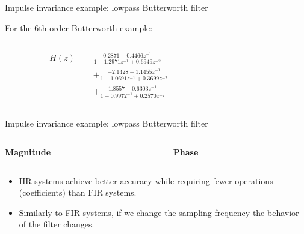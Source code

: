 \documentclass[10pt, aspectratio=169]{beamer}
\begin{document}
%
\begin{frame}{Impulse invariance example: lowpass Butterworth filter}

For the 6th-order Butterworth example:

\begin{columns}
	\begin{column}{0.5\textwidth}
		\begin{align*}
		H(z) =& \frac{0.2871 -0.4466z^{-1}}{1 -1.2971z^{-1} + 0.6949z^{-2}} \\ &+\frac{-2.1428 +1.1455z^{-1}}{1 -1.0691z^{-1} + 0.3699z^{-2}}  \\
		&+\frac{1.8557 - 0.6303z^{-1}}{1 -0.9972^{-1} + 0.2570z^{-2}} 
		\end{align*}
	\end{column}
	
	\begin{column}{0.5\textwidth}
		\begin{center}
			\resizebox{\linewidth}{!}{}
		\end{center}
	\end{column}
\end{columns}
\end{frame}

%
\begin{frame}{Impulse invariance example: lowpass Butterworth filter}

\begin{columns}
	\begin{column}{0.5\textwidth}
		\textbf{Magnitude}
		\begin{center}
			\resizebox{0.8\linewidth}{!}{}
		\end{center}
	\end{column}
	\begin{column}{0.5\textwidth}
		\textbf{Phase}
		\begin{center}
			\resizebox{0.8\linewidth}{!}{}
		\end{center}
	\end{column}
\end{columns}

\begin{itemize}
	\item IIR systems achieve better accuracy while requiring fewer operations (coefficients) than FIR systems.
	\item Similarly to FIR systems, if we change the sampling frequency the behavior of the filter changes.
\end{itemize}
\end{frame}
\end{document}
